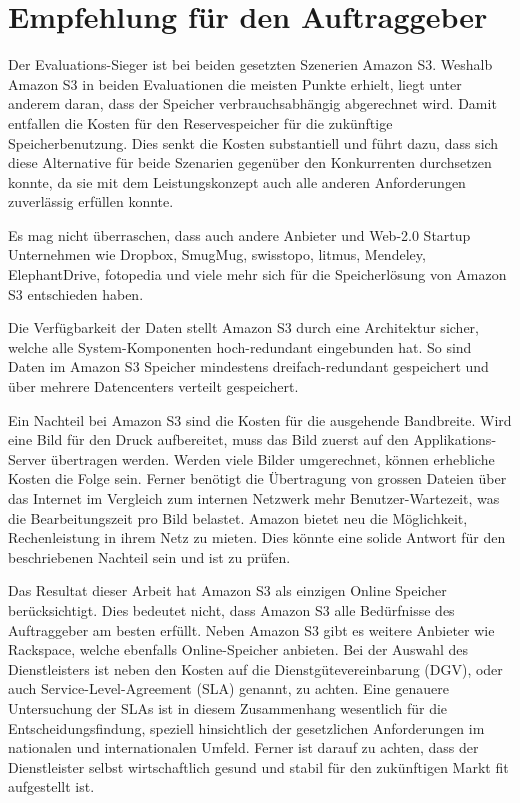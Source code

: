 \cleardoublepage
\chapter{Empfehlung für den Auftraggeber}

Der Evaluations-Sieger ist bei beiden gesetzten Szenerien Amazon S3. Weshalb Amazon S3 in beiden Evaluationen die meisten Punkte erhielt, liegt unter anderem daran, dass der Speicher verbrauchsabhängig abgerechnet wird. Damit entfallen die Kosten für den Reservespeicher für die zukünftige Speicherbenutzung. Dies senkt die Kosten substantiell und führt dazu, dass sich diese Alternative für beide Szenarien gegenüber den Konkurrenten durchsetzen konnte, da sie mit dem Leistungskonzept auch alle anderen Anforderungen zuverlässig erfüllen konnte.

Es mag nicht überraschen, dass auch andere Anbieter und Web-2.0 Startup Unternehmen wie Dropbox, SmugMug, swisstopo, litmus, Mendeley, ElephantDrive, fotopedia und viele mehr sich für die Speicherlösung von Amazon S3 entschieden haben.

Die Verfügbarkeit der Daten stellt Amazon S3 durch eine Architektur sicher, welche alle System-Komponenten hoch-redundant eingebunden hat. So sind Daten im Amazon S3 Speicher mindestens dreifach-redundant gespeichert und über mehrere Datencenters verteilt gespeichert.

Ein Nachteil bei Amazon S3 sind die Kosten für die ausgehende Bandbreite. Wird eine Bild für den Druck aufbereitet, muss das Bild zuerst auf den Applikations-Server übertragen werden. Werden viele Bilder umgerechnet, können erhebliche Kosten die Folge sein. Ferner benötigt die Übertragung von grossen Dateien über das Internet im Vergleich zum internen Netzwerk mehr Benutzer-Wartezeit, was die Bearbeitungszeit pro Bild belastet. Amazon bietet neu die Möglichkeit, Rechenleistung in ihrem Netz zu mieten. Dies könnte eine solide Antwort für den beschriebenen Nachteil sein und ist zu prüfen.

Das Resultat dieser Arbeit hat Amazon S3 als einzigen Online Speicher berücksichtigt. Dies bedeutet nicht, dass Amazon S3 alle Bedürfnisse des Auftraggeber am besten erfüllt. Neben Amazon S3 gibt es weitere Anbieter wie Rackspace, welche ebenfalls Online-Speicher anbieten. Bei der Auswahl des Dienstleisters ist neben den Kosten auf die Dienstgütevereinbarung (DGV), oder auch Service-Level-Agreement (SLA) genannt, zu achten. Eine genauere Untersuchung der SLAs ist in diesem Zusammenhang wesentlich für die Entscheidungsfindung, speziell hinsichtlich der gesetzlichen Anforderungen im nationalen und internationalen Umfeld. Ferner ist darauf zu achten, dass der Dienstleister selbst wirtschaftlich gesund und stabil für den zukünftigen Markt fit aufgestellt ist. 

